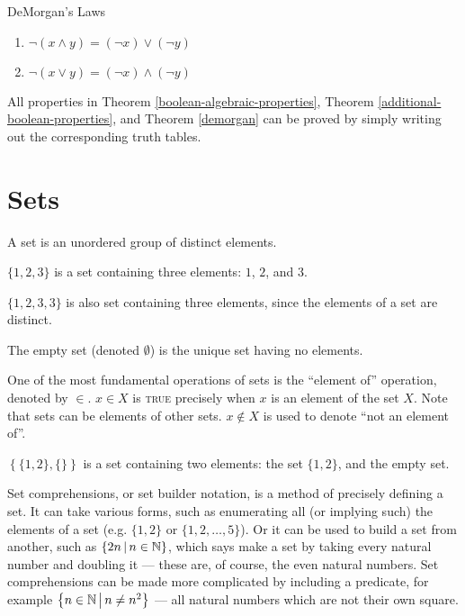 \begin{thm}{DeMorgan's Laws}\label{demorgan}\proofbreak
    \begin{enumerate}
        \item $\neg(x \land y) = (\neg x) \lor (\neg y)$
        \item $\neg(x \lor y) = (\neg x) \land (\neg y)$
    \end{enumerate}
\end{thm}

\begin{rmk}
    All properties in Theorem \ref{boolean-algebraic-properties}, Theorem \ref{additional-boolean-properties}, and Theorem \ref{demorgan} can be proved by simply writing out the corresponding truth tables.
\end{rmk}

\section{Sets}

\begin{defn}\label{set}
    A set is an unordered group of distinct elements.
\end{defn}

\begin{exmp}
    $\{1, 2, 3\}$ is a set containing three elements: $1$, $2$, and $3$.
\end{exmp}

\begin{rmk}
    $\{1, 2, 3, 3\}$ is also set containing three elements, since the elements of a set are distinct.
\end{rmk}

\begin{defn}\label{empty-set}
    The empty set (denoted $\emptyset$) is the unique set having no elements.
\end{defn}

One of the most fundamental operations of sets is the ``element of'' operation, denoted by $\in$. $x \in X$ is \textsc{true} precisely when $x$ is an element of the set $X$. Note that sets can be elements of other sets. $x \notin X$ is used to denote ``not an element of''.

\begin{exmp}
    $\left\{\{1, 2\}, \{\}\right\}$ is a set containing two elements: the set $\{1, 2\}$, and the empty set.
\end{exmp}

Set comprehensions, or set builder notation, is a method of precisely defining a set. It can take various forms, such as enumerating all (or implying such) the elements of a set (e.g. $\{1, 2\}$ or $\{1, 2, \ldots, 5\}$). Or it can be used to build a set from another, such as $\left\{2n \,\middle|\, n \in \mathbb{N}\right\}$, which says make a set by taking every natural number and doubling it --- these are, of course, the even natural numbers. Set comprehensions can be made more complicated by including a predicate, for example $\left\{n \in \mathbb{N} \,\middle|\, n \neq n^2 \right\}$ --- all natural numbers which are not their own square.

